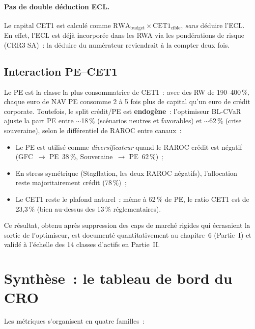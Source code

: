 \documentclass[12pt, a4paper, twoside, openright]{report}
\theoremstyle{definition}
\begin{document}
\paragraph{Pas de double déduction ECL.} Le capital CET1 est calculé comme $\text{RWA}_{\text{budget}} \times \text{CET1}_{\text{cible}}$, \emph{sans} déduire l'ECL. En effet, l'ECL est déjà incorporée dans les RWA via les pondérations de risque (CRR3 SA)~: la déduire du numérateur reviendrait à la compter deux fois.

\subsection{Interaction PE--CET1}

Le PE est la classe la plus consommatrice de CET1~: avec des RW de 190--400\,\%, chaque euro de NAV PE consomme 2 à 5 fois plus de capital qu'un euro de crédit corporate. Toutefois, le split crédit/PE est \textbf{endogène}~: l'optimiseur BL-CVaR ajuste la part PE entre $\sim$18\,\% (scénarios neutres et favorables) et $\sim$62\,\% (crise souveraine), selon le différentiel de RAROC entre canaux~:
\begin{itemize}[nosep]
  \item Le PE est utilisé comme \emph{diversificateur} quand le RAROC crédit est négatif (GFC~$\to$ PE~38\,\%, Souveraine~$\to$ PE~62\,\%)~;
  \item En stress symétrique (Stagflation, les deux RAROC négatifs), l'allocation reste majoritairement crédit (78\,\%)~;
  \item Le CET1 reste le plafond naturel~: même à 62\,\% de PE, le ratio CET1 est de 23{,}3\,\% (bien au-dessus des 13\,\% réglementaires).
\end{itemize}

Ce résultat, obtenu après suppression des caps de marché rigides qui écrasaient la sortie de l'optimiseur, est documenté quantitativement au chapitre~6 (Partie~I) et validé à l'échelle des 14 classes d'actifs en Partie~II.

\section{Synthèse~: le tableau de bord du CRO}
\label{sec:metriques:synthese}

Les métriques s'organisent en quatre familles~:
\end{document}
